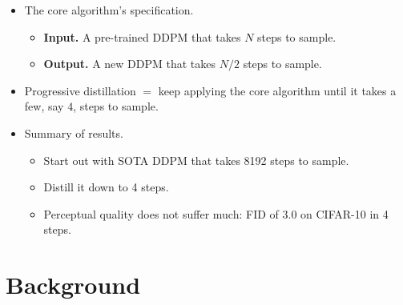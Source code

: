 \documentclass[10pt]{article}
\begin{document}
\begin{itemize}
  \item The core algorithm's specification.
  \begin{itemize}
    \item {\bf Input.} A pre-trained DDPM that takes $N$ steps to sample.
    \item {\bf Output.} A new DDPM that takes $N/2$ steps to sample.
  \end{itemize}

  \item Progressive distillation $=$ keep applying the core algorithm until it takes a few, say $4$, steps to sample.
  
  \item Summary of results.
  \begin{itemize}
    \item Start out with SOTA DDPM that takes 8192 steps to sample.
    \item Distill it down to 4 steps.
    \item Perceptual quality does not suffer much: FID of 3.0 on CIFAR-10 in 4 steps.
  \end{itemize}
\end{itemize}

\section{Background}
\end{document}
